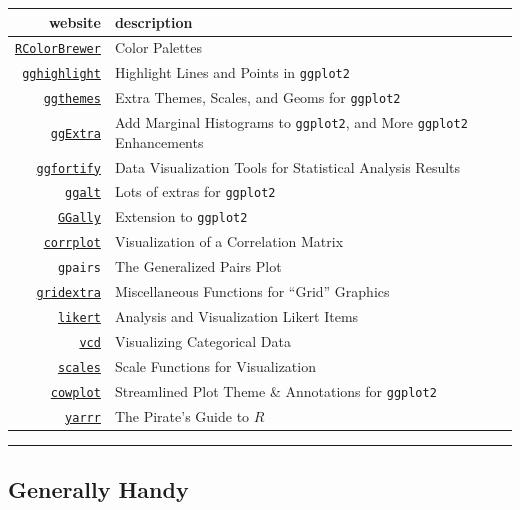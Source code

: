 \documentclass[]{book}
\theoremstyle{definition}
\theoremstyle{definition}
\theoremstyle{definition}
\theoremstyle{remark}
\begin{document}
\begin{longtable}[]{@{}rl@{}}
\toprule
website & description\tabularnewline
\midrule
\endhead
\href{https://data.library.virginia.edu/setting-up-color-palettes-in-r/}{\texttt{RColorBrewer}}
& Color Palettes\tabularnewline
\href{https://github.com/yutannihilation/gghighlight}{\texttt{gghighlight}}
& Highlight Lines and Points in \texttt{ggplot2}\tabularnewline
\href{https://www.ggplot2-exts.org/ggthemes.html}{\texttt{ggthemes}} &
Extra Themes, Scales, and Geoms for \texttt{ggplot2}\tabularnewline
\href{https://www.ggplot2-exts.org/ggExtra.html}{\texttt{ggExtra}} & Add
Marginal Histograms to \texttt{ggplot2}, and More \texttt{ggplot2}
Enhancements\tabularnewline
\href{https://github.com/sinhrks/ggfortify}{\texttt{ggfortify}} & Data
Visualization Tools for Statistical Analysis Results\tabularnewline
\href{https://github.com/hrbrmstr/ggalt}{\texttt{ggalt}} & Lots of
extras for \texttt{ggplot2}\tabularnewline
\href{https://ggobi.github.io/ggally/\#canonical_correlation_analysis}{\texttt{GGally}}
& Extension to \texttt{ggplot2}\tabularnewline
\href{https://rstudio-pubs-static.s3.amazonaws.com/240657_5157ff98e8204c358b2118fa69162e18.html}{\texttt{corrplot}}
& Visualization of a Correlation Matrix\tabularnewline
\texttt{gpairs} & The Generalized Pairs Plot\tabularnewline
\href{https://cran.r-project.org/web/packages/egg/vignettes/Ecosystem.html}{\texttt{gridextra}}
& Miscellaneous Functions for ``Grid'' Graphics\tabularnewline
\href{https://github.com/jbryer/likert}{\texttt{likert}} & Analysis and
Visualization Likert Items\tabularnewline
\href{http://www.datavis.ca/courses/VCD/vcd-tutorial.pdf}{\texttt{vcd}}
& Visualizing Categorical Data\tabularnewline
\href{https://github.com/r-lib/scales}{\texttt{scales}} & Scale
Functions for Visualization\tabularnewline
\href{https://cran.r-project.org/web/packages/cowplot/vignettes/introduction.html}{\texttt{cowplot}}
& Streamlined Plot Theme \& Annotations for
\texttt{ggplot2}\tabularnewline
\href{https://ndphillips.github.io/piratesguide.html}{\texttt{yarrr}} &
The Pirate's Guide to \(R\)\tabularnewline
\bottomrule
\end{longtable}

\begin{center}\rule{0.5\linewidth}{\linethickness}\end{center}

\subsection{Generally Handy}\label{generally-handy}
\end{document}
